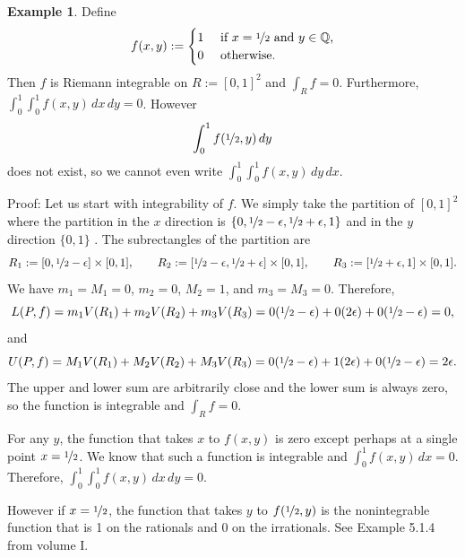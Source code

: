 \documentclass[12pt]{book}
\newcommand{\volIref}[1]{#1}
\newcommand{\Q}{{\mathbb{Q}}}
\theoremstyle{plain}
\theoremstyle{remark}
\theoremstyle{definition}
\theoremstyle{exercise}
\theoremstyle{example}
\newtheorem{example}[thm]{Example}
\begin{document}
\begin{example}
Define 
\begin{equation*}
f(x,y) := 
\begin{cases}
1 & \text{ if $x=\nicefrac{1}{2}$ and $y \in \Q$,} \\
0 & \text{ otherwise.}
\end{cases}
\end{equation*}
Then $f$ is Riemann integrable on $R := [0,1]^2$ and $\int_R f = 0$.
Furthermore, $\int_0^1 \int_0^1 f(x,y) \, dx \, dy = 0$.
However
\begin{equation*}
\int_0^1 f(\nicefrac{1}{2},y) \, dy
\end{equation*}
does not exist, so we cannot even write $\int_0^1 \int_0^1 f(x,y) \, dy \,
dx$.

Proof:
Let us start with integrability of $f$.  We simply take the partition
of $[0,1]^2$ where the partition in the $x$ direction is
$\{ 0, \nicefrac{1}{2}-\epsilon,
\nicefrac{1}{2}+\epsilon,1\}$ and in the $y$ direction $\{ 0, 1 \}$ .
The subrectangles of the partition are
\begin{equation*}
R_1 := [0,
\nicefrac{1}{2}-\epsilon] \times [0,1],
\qquad
R_2 := [\nicefrac{1}{2}-\epsilon,
\nicefrac{1}{2}+\epsilon] \times [0,1],
\qquad
R_3 := [\nicefrac{1}{2}+\epsilon,1] \times [0,1] .
\end{equation*}
We have $m_1 = M_1 = 0$, $m_2 =0$, $M_2 = 1$, and $m_3 = M_3 = 0$.
Therefore,
\begin{equation*}
L(P,f) = 
m_1 V(R_1)
+
m_2 V(R_2)
+
m_3 V(R_3)
=
0 (\nicefrac{1}{2}-\epsilon)
+
0 (2\epsilon)
+
0 (\nicefrac{1}{2}-\epsilon) = 0 ,
\end{equation*}
and
\begin{equation*}
U(P,f) = 
M_1 V(R_1)
+
M_2 V(R_2)
+
M_3 V(R_3)
=
0 (\nicefrac{1}{2}-\epsilon)
+
1 (2\epsilon)
+
0 (\nicefrac{1}{2}-\epsilon) = 2 \epsilon .
\end{equation*}
The upper and lower sum are arbitrarily close and the lower sum is always
zero, so the function is integrable and $\int_R f = 0$.

For any $y$, the function that takes $x$ to $f(x,y)$ is zero except
perhaps at a single point $x=\nicefrac{1}{2}$.  We know that such a
function is integrable and $\int_0^1 f(x,y) \, dx = 0$.  Therefore,
$\int_0^1 \int_0^1 f(x,y) \, dx \, dy = 0$.

However if $x=\nicefrac{1}{2}$, the function that takes $y$ to
$f(\nicefrac{1}{2},y)$ is the nonintegrable function that is
1 on the rationals and 0 on the irrationals.
See \volIref{Example 5.1.4 from volume I}.
\end{example}
\end{document}
